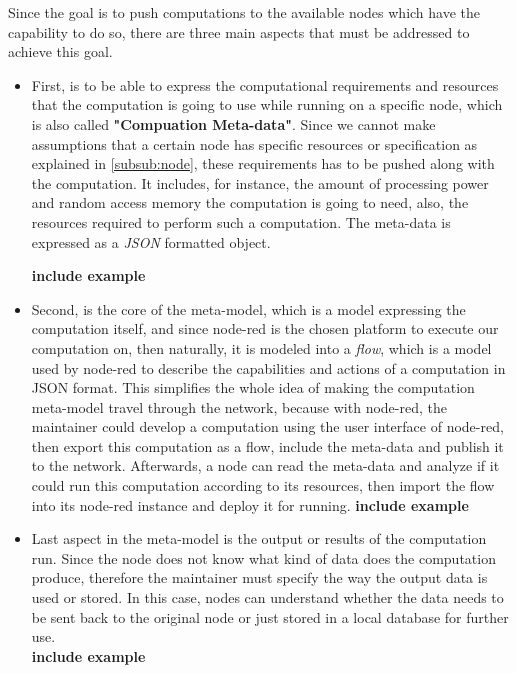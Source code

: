 Since the goal is to push computations to the available nodes which have the capability to do so, there are three main aspects that must be addressed to achieve this goal.
\begin{itemize}
	
	\item First, is to be able to express the computational requirements and resources that the computation is going to use while running on a specific node, which is also called \textbf{"Compuation Meta-data"}. Since we cannot make assumptions that a certain node has specific resources or specification as explained in \ref{subsub:node}, these requirements has to be pushed along with the computation. It includes, for instance, the amount of processing power and random access memory the computation is going to need, also, the resources required to perform such a computation.
	The meta-data is expressed as a \textit{JSON} formatted object.
	
	\textbf{include example}
	
	\item Second, is the core of the meta-model, which is a model expressing the computation itself, and since node-red is the chosen platform to execute our computation on, then naturally, it is modeled into a \textit{flow}, which is a model used by node-red to describe the capabilities and actions of a computation in JSON format. This simplifies the whole idea of making the computation meta-model travel through the network, because with node-red, the maintainer could develop a computation using the user interface of node-red, then export this computation as a flow, include the meta-data and publish it to the network. Afterwards, a node can read the meta-data and analyze if it could run this computation according to its resources, then import the flow into its node-red instance and deploy it for running.
	\textbf{include example}
	
	\item Last aspect in the meta-model is the output or results of the computation run. Since the node does not know what kind of data does the computation produce, therefore the maintainer must specify the way the output data is used or stored. In this case, nodes can understand whether the data needs to be sent back to the original node or just stored in a local database for further use. \\
	\textbf{include example}
\end{itemize}
\fi
